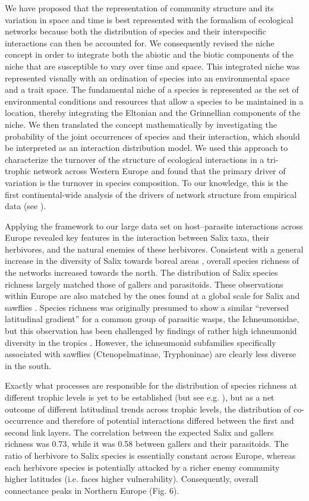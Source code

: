 \documentclass[12pt]{article}
\begin{document}
We have proposed that the representation of community structure and its variation
in space and time is best represented with the formalism of ecological
networks because both the distribution of species and their interspecific
interactions can then be accounted for. We consequently revised the niche concept in
order to integrate both the abiotic and the biotic components of the niche
that are susceptible to vary over time and space. This integrated niche was
represented visually with an ordination of species into an environmental space
and a trait space. The fundamental niche of a species is represented as the
set of environmental conditions and resources that allow a species to be
maintained in a location, thereby integrating the Eltonian and the Grinnellian
components of the niche. We then translated the concept mathematically by
investigating the probability of the joint occurrences of species and
their interaction, which should be interpreted as an interaction distribution
model. We used this approach to characterize the turnover of the structure of
ecological interactions in a tri-trophic network across Western Europe and
found that the primary driver of variation is the turnover in species
composition. To our knowledge, this is the first continental-wide analysis of
the drivers of network structure from empirical data (see \citealt{Albouy2014,
Poisot2016}).

Applying the framework to our large data set on host–parasite interactions
across Europe revealed key features in the interaction between Salix taxa, their
herbivores, and the natural enemies of these herbivores. Consistent with a
general increase in the diversity of Salix towards boreal areas
\citep{Cronk2015}, overall species richness of the networks increased towards
the north. The distribution of Salix species richness largely matched those of
gallers and parasitoids. These observations within Europe are
also matched by the ones found at a global scale for Salix \citep{Argus1997,
Cronk2015, Wu2015} and sawflies \citep{Kouki1994, Kouki1999}. Species richness
was originally presumed to show a similar ``reversed latitudinal gradient'' for
a common group of parasitic wasps, the Ichneumonidae, but this observation
has been challenged by findings of rather high ichneumonid diversity in the
tropics \citep{Veijalainen2013}. However, the ichneumonid subfamilies
specifically associated with sawflies (Ctenopelmatinae, Tryphoninae) are
clearly less diverse in the south.

Exactly what processes are responsible for the distribution of species
richness at different trophic levels is yet to be established (but see e.g.
\citealt{Roininen2005, Nyman2010, Leppanen2014}), but as a net
outcome of different latitudinal trends across trophic levels, the
distribution of co-occurrence and therefore of potential interactions differed
between the first and second link layers. The correlation between the expected
Salix and gallers richness was 0.73, while it was 0.58 between gallers and
their parasitoids. The ratio of herbivore to Salix species is essentially constant
across Europe, whereas each herbivore species is potentially attacked by a
richer enemy community higher latitudes (i.e. faces higher vulnerability).
Consequently, overall connectance peaks in Northern Europe (Fig. 6).
\end{document}
